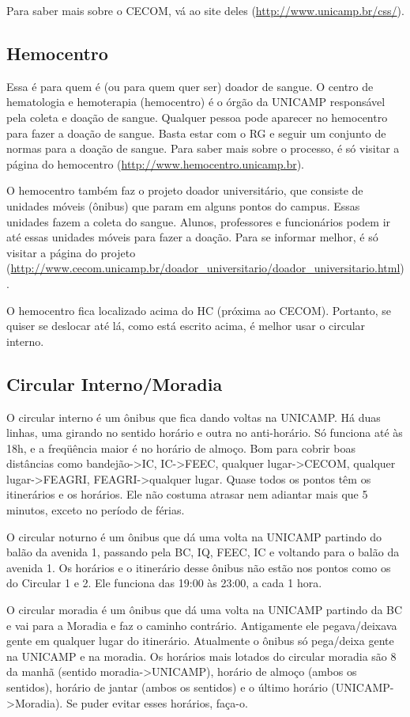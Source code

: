\documentclass[a4paper,10pt]{article}
\begin{document}
Para saber mais sobre o CECOM, vá ao site deles
(\url{http://www.unicamp.br/css/}).

\subsection{Hemocentro}
Essa é para quem é (ou para quem quer ser) doador de sangue. O centro de
hematologia e hemoterapia (hemocentro) é o órgão da UNICAMP responsável pela
coleta e doação de sangue. Qualquer pessoa pode aparecer no hemocentro para
fazer a doação de sangue. Basta estar com o RG e seguir um conjunto de normas
para a doação de sangue. Para saber mais sobre o processo, é só visitar a página
do hemocentro (\url{http://www.hemocentro.unicamp.br}).

O hemocentro também faz o projeto doador universitário, que consiste de unidades
móveis (ônibus) que param em alguns pontos do campus. Essas unidades fazem
a coleta do sangue. Alunos, professores e funcionários podem ir até essas
unidades móveis para fazer a doação. Para se informar melhor, é só visitar
a página do projeto
(\url{http://www.cecom.unicamp.br/doador_universitario/doador_universitario.html}).

O hemocentro fica localizado acima do HC (próxima ao CECOM). Portanto, se quiser
se deslocar até lá, como está escrito acima, é melhor usar o circular interno.

\subsection{Circular Interno/Moradia}
O circular interno é um ônibus que fica dando voltas na UNICAMP. Há duas linhas,
uma girando no sentido horário e outra no anti-horário. Só funciona até às 18h,
e a freqüência maior é no horário de almoço. Bom para cobrir boas distâncias
como bandejão->IC, IC->FEEC, qualquer lugar->CECOM, qualquer lugar->FEAGRI,
FEAGRI->qualquer lugar. Quase todos os pontos têm os itinerários e os horários.
Ele não costuma atrasar nem adiantar mais que 5 minutos, exceto no período de
férias.

O circular noturno é um ônibus que dá uma volta na UNICAMP partindo do balão da
avenida 1, passando pela BC, IQ, FEEC, IC e voltando para o balão da avenida 1.
Os horários e o itinerário desse ônibus não estão nos pontos como os do Circular
1 e 2. Ele funciona das 19:00 às 23:00, a cada 1 hora.

O circular moradia é um ônibus que dá uma volta na UNICAMP partindo da BC e vai
para a Moradia e faz o caminho contrário. Antigamente ele pegava/deixava gente
em qualquer lugar do itinerário. Atualmente o ônibus só pega/deixa gente na
UNICAMP e na moradia. Os horários mais lotados do circular moradia são 8 da
manhã (sentido moradia->UNICAMP), horário de almoço (ambos os sentidos), horário
de jantar (ambos os sentidos) e o último horário (UNICAMP->Moradia). Se puder
evitar esses horários, faça-o.
\end{document}
